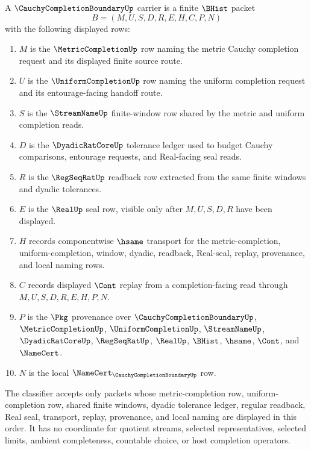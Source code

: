 \begin{definition}
\label{def:cauchy-completion-boundary-carrier}
A $\CauchyCompletionBoundaryUp$ carrier is a finite $\BHist$ packet
$$
B=(M,U,S,D,R,E,H,C,P,N)
$$
with the following displayed rows:
\begin{enumerate}
\item $M$ is the $\MetricCompletionUp$ row naming the metric Cauchy completion request and its displayed finite source route.
\item $U$ is the $\UniformCompletionUp$ row naming the uniform completion request and its entourage-facing handoff route.
\item $S$ is the $\StreamNameUp$ finite-window row shared by the metric and uniform completion reads.
\item $D$ is the $\DyadicRatCoreUp$ tolerance ledger used to budget Cauchy comparisons, entourage requests, and Real-facing seal reads.
\item $R$ is the $\RegSeqRatUp$ readback row extracted from the same finite windows and dyadic tolerances.
\item $E$ is the $\RealUp$ seal row, visible only after $M,U,S,D,R$ have been displayed.
\item $H$ records componentwise $\hsame$ transport for the metric-completion, uniform-completion, window, dyadic, readback, Real-seal, replay, provenance, and local naming rows.
\item $C$ records displayed $\Cont$ replay from a completion-facing read through $M,U,S,D,R,E,H,P,N$.
\item $P$ is the $\Pkg$ provenance over $\CauchyCompletionBoundaryUp$, $\MetricCompletionUp$, $\UniformCompletionUp$, $\StreamNameUp$, $\DyadicRatCoreUp$, $\RegSeqRatUp$, $\RealUp$, $\BHist$, $\hsame$, $\Cont$, and $\NameCert$.
\item $N$ is the local $\NameCert_{\CauchyCompletionBoundaryUp}$ row.
\end{enumerate}
The classifier accepts only packets whose metric-completion row, uniform-completion row, shared finite windows, dyadic tolerance ledger, regular readback, Real seal, transport, replay, provenance, and local naming are displayed in this order. It has no coordinate for quotient streams, selected representatives, selected limits, ambient completeness, countable choice, or host completion operators.
\end{definition}

